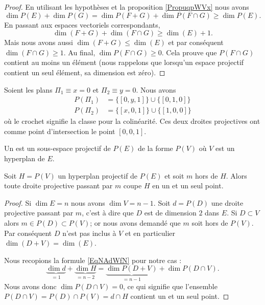 \begin{proof}
    En utilisant les hypothèses et la proposition \ref{PropuqpWVx} nous avons
    \begin{equation}
        \dim P(E)+\dim P(G)=\dim P(F+G)+\dim P(F\cap G)\geq \dim P(E).
    \end{equation}
    En passant aux espaces vectoriels correspondants,
    \begin{equation}
        \dim(F+G)+\dim(F\cap G)\geq \dim(E)+1.
    \end{equation}
    Mais nous avons aussi \( \dim(F+G)\leq \dim(E)\) et par conséquent \( \dim(F\cap G)\geq 1\). Au final, \( \dim P(F\cap G)\geq 0\). Cela prouve que \( P(F\cap G)\) contient au moins un élément (nous rappelons que lorsqu'un espace projectif contient un seul élément, sa dimension est zéro).
\end{proof}

\begin{example}
    Soient les plans \( \Pi_1\equiv x=0\) et \( \Pi_2\equiv y=0\). Nous avons
    \begin{subequations}
        \begin{align}
            P(\Pi_1)&=\{ [0,y,1] \}\cup\{ [0,1,0] \}\\
            P(\Pi_2)&=\{ [x,0,1] \}\cup\{ [1,0,0] \}
        \end{align}
    \end{subequations}
    où le crochet signifie la classe pour la colinéarité. Ces deux droites projectives ont comme point d'intersection le point \( [0,0,1]\).
\end{example}

\begin{definition}
    Un  est un sous-espace projectif de \( P(E)\) de la forme \( P(V)\) où \( V\) est un hyperplan de \( E\).
\end{definition}

\begin{proposition}
    Soit \( H=P(V)\) un hyperplan projectif de \( P(E)\) et soit \( m\) hors de \( H\). Alors toute droite projective passant par \( m\) coupe \( H\) en un et un seul point.
\end{proposition}

\begin{proof}
    Si \( \dim E=n\) nous avons \( \dim V=n-1\). Soit \( d=P(D)\) une droite projective passant par \( m\), c'est à dire que \( D\) est de dimension \( 2\) dans \( E\). Si \( D\subset V\) alors \( m\in P(D)\subset P(V)\); or nous avons demandé que \( m\) soit hors de \( P(V)\). Par conséquent \( D\) n'est pas inclus à \( V\) et en particulier \( \dim(D+V)=\dim(E)\).

    Nous recopions la formule \eqref{EqNAdWfN} pour notre cas :
    \begin{equation}
        \underbrace{\dim d}_{=1}+\underbrace{\dim H}_{=n-2}=\underbrace{\dim P(D+V)}_{=n-1}+\dim P(D\cap V).
    \end{equation}
    Nous avons donc \( \dim P(D\cap V)=0\), ce qui signifie que l'ensemble \( P(D\cap V)=P(D)\cap P(V)=d\cap H\) contient un et un seul point.
\end{proof}

